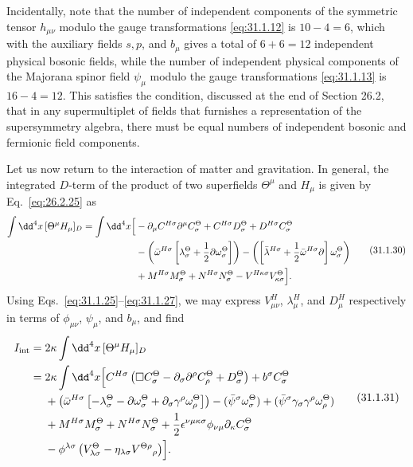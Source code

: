 Incidentally, note that the number of independent components of the symmetric
tensor \(h_{\mu\nu}\) modulo the gauge transformations \eqref{eq:31.1.12} is
\(10-4=6\), which with the auxiliary fields \(s,p\), and \(b_\mu\) gives a
total of \(6+6=12\) independent physical bosonic fields, while the number of
independent physical components of the Majorana spinor field \(\psi_\mu\)
modulo the gauge transformations \eqref{eq:31.1.13} is \(16-4=12\). This
satisfies the condition, discussed at the end of Section 26.2, that in any
supermultiplet of fields that furnishes a representation of the supersymmetry
algebra, there must be equal numbers of independent bosonic and fermionic
field components.

Let us now return to the interaction of matter and gravitation. In general,
the integrated \(D\)-term of the product of two superfields \(\Theta^\mu\)
and \(H_\mu\) is given by Eq.~\eqref{eq:26.2.25} as
\begin{equation}
  \begin{aligned}
  \int \dd^4x\,[\Theta^\mu H_\mu]_D
  =\int \dd^4x\Bigl[&
    -\partial_\mu C^{H\sigma}\partial^\mu C_\sigma^\Theta
    +C^{H\sigma}D_\sigma^\Theta
    +D^{H\sigma}C_\sigma^\Theta
  \\
  &-\left(\bar\omega^{H\sigma}
    \left[\lambda_\sigma^\Theta
      +\frac12\sl{\partial}\omega_\sigma^\Theta\right]\right)
    -\left(
      \left[\bar\lambda^{H\sigma}
        +\frac12\bar\omega^{H\sigma}\sl{\partial}\right]
      \omega_\sigma^\Theta
    \right)
  \\
  &+M^{H\sigma}M_\sigma^\Theta
    +N^{H\sigma}N_\sigma^\Theta
    -V^{H\kappa\sigma}V_{\kappa\sigma}^\Theta
  \Bigr].
  \end{aligned}
  \tag{31.1.30}\label{eq:31.1.30}
\end{equation}
Using Eqs.~\eqref{eq:31.1.25}--\eqref{eq:31.1.27}, we may express
\(V_{\mu\nu}^H\), \(\lambda_\mu^H\), and \(D_\mu^H\) respectively in terms
of \(\phi_{\mu\nu}\), \(\psi_\mu\), and \(b_\mu\), and find
\begin{equation}
  \begin{aligned}
  I_{\mathrm{int}}
  ={}&2\kappa\int \dd^4x\,[\Theta^\mu H_\mu]_D
  \\
  ={}&2\kappa\int \dd^4x\Bigl[
    C^{H\sigma}\left(
      \Box C_\sigma^\Theta
      -\partial_\sigma\partial^\rho C_\rho^\Theta
      +D_\sigma^\Theta
    \right)
    +b^\sigma C_\sigma^\Theta
  \\
  &+\left(\bar\omega^{H\sigma}
    \left[
      -\lambda_\sigma^\Theta
      -\sl{\partial}\omega_\sigma^\Theta
      +\partial_\sigma\gamma^\rho\omega_\rho^\Theta
    \right]\right)
    -(\bar\psi^\sigma\omega_\sigma^\Theta)
    +(\bar\psi^\sigma\gamma_\sigma\gamma^\rho\omega_\rho^\Theta)
  \\
  &+M^{H\sigma}M_\sigma^\Theta
    +N^{H\sigma}N_\sigma^\Theta
    +\frac12\epsilon^{\nu\mu\kappa\sigma}
      \phi_{\nu\mu}\partial_\kappa C_\sigma^\Theta
  \\
  &-\phi^{\lambda\sigma}
    \left(
      V_{\lambda\sigma}^\Theta
      -\eta_{\lambda\sigma}V^{\Theta\rho}{}_\rho
    \right)
  \Bigr].
  \end{aligned}
  \tag{31.1.31}\label{eq:31.1.31}
\end{equation}
